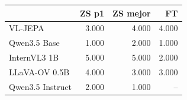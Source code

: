 \begin{tabular}{lrrr}
\toprule
 & ZS p1 & ZS mejor & FT \\
\midrule
VL-JEPA & 3.000 & 4.000 & 4.000 \\
Qwen3.5 Base & 1.000 & 2.000 & 1.000 \\
InternVL3 1B & 5.000 & 5.000 & 2.000 \\
LLaVA-OV 0.5B & 4.000 & 3.000 & 3.000 \\
Qwen3.5 Instruct & 2.000 & 1.000 & -- \\
\bottomrule
\end{tabular}
